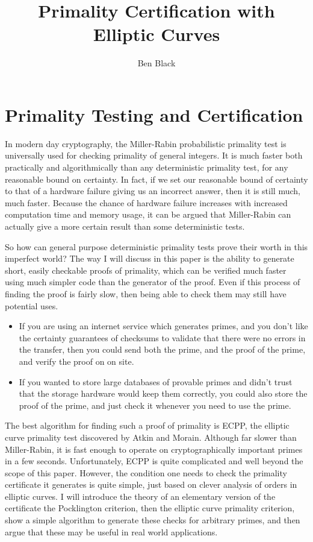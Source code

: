 \documentclass[]{article}
\title{Primality Certification with Elliptic Curves}
\author{Ben Black}
\begin{document}
\lstset{language=Python}

\maketitle

\section{Primality Testing and Certification}

In modern day cryptography, the Miller-Rabin probabilistic primality test is universally used for checking primality of general integers. It is much faster both practically and algorithmically than any deterministic primality test, for any reasonable bound on certainty. In fact, if we set our reasonable bound of certainty to that of a hardware failure giving us an incorrect answer, then it is still much, much faster. Because the chance of hardware failure increases with increased computation time and memory usage, it can be argued that Miller-Rabin can actually give a more certain result than some deterministic tests.

So how can general purpose deterministic primality tests prove their worth in this imperfect world? The way I will discuss in this paper is the ability to generate short, easily checkable proofs of primality, which can be verified much faster using much simpler code than the generator of the proof. Even if this process of finding the proof is fairly slow, then being able to check them may still have potential uses.

\begin{itemize}
	\item If you are using an internet service which generates primes, and you don't like the certainty guarantees of checksums to validate that there were no errors in the transfer, then you could send both the prime, and the proof of the prime, and verify the proof on on site.
	\item If you wanted to store large databases of provable primes and didn't trust that the storage hardware would keep them correctly, you could also store the proof of the prime, and just check it whenever you need to use the prime. 
\end{itemize}

The best algorithm for finding such a proof of primality is ECPP, the elliptic curve primality test discovered by Atkin and Morain. Although far slower than Miller-Rabin, it is fast enough to operate on cryptographically important primes in a few seconds. Unfortunately, ECPP is quite complicated and well beyond the scope of this paper. However, the condition one needs to check the primality certificate it generates is quite simple, just based on clever analysis of orders in elliptic curves. I will introduce the theory of an elementary version of the certificate the Pocklington criterion, then the elliptic curve primality criterion, show a simple algorithm to generate these checks for arbitrary primes, and then argue that these may be useful in real world applications.
\end{document}
